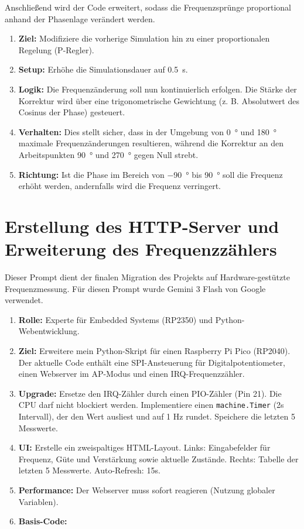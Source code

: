 \documentclass[a4paper,11pt]{book}
\begin{document}
Anschließend wird der Code erweitert, sodass die Frequenzsprünge proportional anhand der Phasenlage verändert werden.\par
\medskip

\begin{enumerate}
\item \textbf{Ziel:} Modifiziere die vorherige Simulation hin zu einer proportionalen Regelung (P-Regler).
\item \textbf{Setup:} Erhöhe die Simulationsdauer auf \SI{0.5}{\second}.
\item \textbf{Logik:} Die Frequenzänderung soll nun kontinuierlich erfolgen. Die Stärke der Korrektur  wird über eine trigonometrische Gewichtung (z. B. Absolutwert des Cosinus der Phase) gesteuert.
\item \textbf{Verhalten:} Dies stellt sicher, dass in der Umgebung von \SI{0}{\degree} und \SI{180}{\degree} maximale Frequenzänderungen resultieren, während die Korrektur an den Arbeitspunkten \SI{90}{\degree} und \SI{270}{\degree} gegen Null strebt.
\item \textbf{Richtung:} Ist die Phase im Bereich von \SI{-90}{\degree} bis \SI{90}{\degree} soll die Frequenz erhöht werden, andernfalls wird die Frequenz verringert.
\end{enumerate}


\newpage

\section{Erstellung des HTTP-Server und Erweiterung des Frequenzzählers}
\label{sec:prompt3}

Dieser Prompt dient der finalen Migration des Projekts auf Hardware-gestützte Frequenzmessung. Für diesen Prompt wurde Gemini 3 Flash von Google verwendet. \par
\medskip

\begin{enumerate}
    \item \textbf{Rolle:} Experte für Embedded Systems (RP2350) und Python-Webentwicklung.
    \item \textbf{Ziel:} Erweitere mein Python-Skript für einen Raspberry Pi Pico (RP2040). Der aktuelle Code enthält eine SPI-Ansteuerung für Digitalpotentiometer, einen Webserver im AP-Modus und einen IRQ-Frequenzzähler.
    \item \textbf{Upgrade:} Ersetze den IRQ-Zähler durch einen PIO-Zähler (Pin 21). Die CPU darf nicht blockiert werden. Implementiere einen \texttt{machine.Timer} (2s Intervall), der den Wert ausliest und auf 1 Hz rundet. Speichere die letzten 5 Messwerte.
    \item \textbf{UI:} Erstelle ein zweispaltiges HTML-Layout. Links: Eingabefelder für Frequenz, Güte und Verstärkung sowie aktuelle Zustände. Rechts: Tabelle der letzten 5 Messwerte. Auto-Refresh: 15s.
    \item \textbf{Performance:} Der Webserver muss sofort reagieren (Nutzung globaler Variablen).
    \item \textbf{Basis-Code:}
\end{enumerate}
\end{document}
